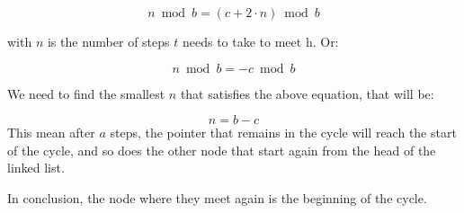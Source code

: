 \documentclass[12pt, letterpaper]{article}
\newcommand{\tortoise}{\textit{t}}
\newcommand{\hare}{\textit{h}}
\begin{document}
\begin{itemize}
\begin{equation}
n \bmod b = (c + 2 \cdot n) \bmod b
\end{equation}

with \(n\) is the number of steps \(\tortoise\) needs to take to meet \(\hare\). Or: 

\begin{equation}
n \bmod b = -c \bmod b
\end{equation}

We need to find the smallest \(n\) that satisfies the above equation, that will be:

\begin{equation}
n  = b-c
\end{equation}
This mean after \(a\) steps, the pointer that remains in the cycle will reach the start of the cycle, and so does the other node that start again from the head of the linked list.

In conclusion, the node where they meet again is the beginning of the cycle.

\end{itemize}
\end{document}
